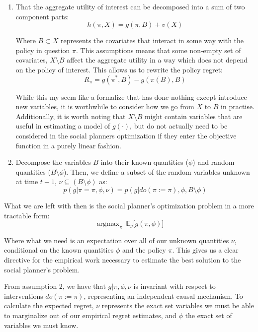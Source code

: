 \documentclass[a4paper,12pt]{article}
\DeclareMathOperator*{\argmax}{argmax}
\begin{document}
\begin{enumerate}

\item That the aggregate utility of interest can be decomposed into a sum of two component parts:
%
$$
h(\pi, X) = g(\pi, B) + v(X)
$$

Where $B \subset X$ represents the covariates that interact in some way with the policy in question $\pi$. This assumptions means that some non-empty set of covariates, $X \setminus B$ affect the aggregate utility in a way which does not depend on the policy of interest. This allows us to rewrite the policy regret:
%
$$
R_{\pi} = g(\pi^*, B) - g(\pi(B), B)
$$

While this my seem like a formalize that has done nothing except introduce new variables, it is worthwhile to consider how we go from $X$ to $B$ in practise. Additionally, it is worth noting that $X \setminus B$ might contain variables that are useful in estimating a model of $g(\cdot)$, but do not actually need to be considered in the social planners optimization if they enter the objective function in a purely linear fashion. 


\item Decompose the variables $B$ into their known quantities ($\phi$) and random quantities ($B \setminus \phi$). Then, we define a subset of the random variables unknown at time $t-1$, $\nu \subseteq (B \setminus \phi)$ as:
%
$$
p(g | \pi = \pi, \phi, \nu) = p(g | do(\pi := \pi), \phi, B \setminus \phi)
$$

\end{enumerate}

What we are left with then is the social planner's optimization problem in a more tractable form:
%
$$
\argmax_{\pi} \ \mathbb{E}_{\nu} \big[ g(\pi, \phi) \big]
$$

Where what we need is an expectation over all of our unknown quantities $\nu$, conditional on the known quantities $\phi$ and the policy $\pi$. This gives us a clear directive for the empirical work necessary to estimate the best solution to the social planner's problem. 

From assumption 2, we have that $g | \pi, \phi, \nu$ is invariant with respect to interventions $do(\pi := \pi)$, representing an independent causal mechanism. To calculate the expected regret, $\nu$ represents the exact set variables we must be able to marginalize out of our empirical regret estimates, and $\phi$ the exact set of variables we must know. 
\end{document}
